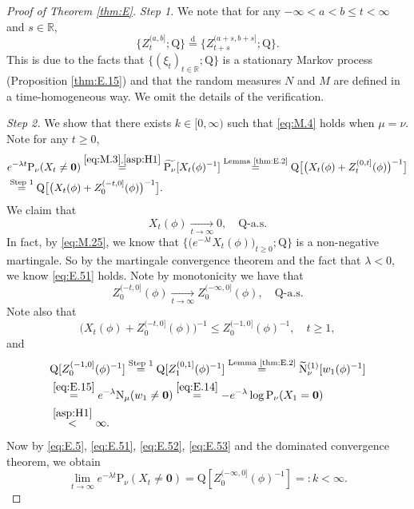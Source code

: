 \documentclass[12pt,a4paper]{amsart}
\numberwithin{equation}{section}
\theoremstyle{plain}
\theoremstyle{definition}
\theoremstyle{remark}
\begin{document}
\begin{proof}[Proof of Theorem \ref{thm:E}]
\emph{Step 1.} We note that for any $-\infty < a < b \leq t<\infty$ and $s\in \mathbb R$,
\[
	\{Z_t^{(a,b]}; \mathrm Q\}
	\overset{\text{d}}= \{Z_{t+s}^{(a+s,b+s]}; \mathrm Q\}.
\]	
	This is due to the facts that $\{(\xi_t)_{t\in \mathbb R};\mathrm Q\}$ is a stationary Markov process (Proposition \ref{thm:E.15}) and that the random measures $N$ and $M$ are defined in a time-homogeneous way.
	We omit the details of the verification.
	
\emph{Step 2.} We show that there exists $k\in [0,\infty)$ such that \eqref{eq:M.4} holds when $\mu = \nu$.
	Note for any $t\geq 0$,
\begin{align}
	&e^{-\lambda t}\mathrm P_\nu(X_t\neq \mathbf 0)
	\overset{\eqref{eq:M.3}, \eqref{asp:H1}}= \widetilde{\mathrm P_\nu}[X_t(\phi)^{-1}]
	\overset{\text{Lemma \ref{thm:E.2}}}=\mathrm Q\big[ \big(X_t(\phi) +Z^{(0,t]}_t(\phi)\big)^{-1}\big]
	\\\label{eq:E.5} &\overset{\text{Step 1}}=\mathrm Q\big[ \big(X_t(\phi) +Z^{(-t,0]}_0(\phi)\big)^{-1}\big].
\end{align}
	We claim that
\begin{equation}\label{eq:E.51}
	X_t(\phi) \xrightarrow[t\to \infty]{} 0, \quad \mathrm Q\text{-a.s.}
\end{equation}
	In fact, by \eqref{eq:M.25}, we know that $\big\{\big(e^{-\lambda t} X_t(\phi)\big)_{t\geq 0}; \mathrm Q\big\}$ is a non-negative martingale.
	So by the martingale convergence theorem and the fact that $\lambda < 0$, we know \eqref{eq:E.51} holds.
	Note  by monotonicity we have that
\begin{equation} \label{eq:E.52}
	Z^{(-t,0]}_0(\phi)
	\xrightarrow[t\to \infty]{} Z^{(-\infty,0]}_0(\phi),
	\quad \mathrm Q\text{-a.s.}
\end{equation}
Note also that
\begin{equation}\label{eq:E.53}
	\big(X_t(\phi) + Z^{(-t,0]}_0(\phi)\big)^{-1}
	\leq Z^{(-1,0]}_0(\phi)^{-1},
	\quad t\geq 1,
\end{equation}
	and
\begin{align}
	&\mathrm Q [Z^{(-1,0]}_0(\phi)^{-1}]
	\overset{\text{Step 1}} = \mathrm Q [Z^{(0,1]}_1(\phi)^{-1}]
	\overset{\text{Lemma \ref{thm:E.2}}}=
	\widetilde {\mathrm N}_\nu^{(1)} [w_1(\phi)^{-1}]
	\\&\overset{\eqref{eq:E.15}}= e^{-\lambda}
	\mathrm N_\mu(w_1\neq \mathbf 0)
	\overset{\eqref{eq:E.14}} = -e^{-\lambda} \log \mathrm P_{\nu}(X_1 = \mathbf 0)
	\\& \label{eq:E.54} \overset{\eqref{asp:H1}}< \infty.
\end{align}
	Now by \eqref{eq:E.5}, \eqref{eq:E.51}, \eqref{eq:E.52}, \eqref{eq:E.53} and the dominated  convergence theorem, we obtain
	\begin{equation}\label{eq:E.55}
		 \lim_{t\to\infty} e^{-\lambda t}\mathrm P_{\nu}(X_t \neq \mathbf 0)
	 =\mathrm Q[Z^{(-\infty,0]}_0(\phi)^{-1}]
	 =:k<\infty.
	\end{equation}


\end{proof}
\end{document}
